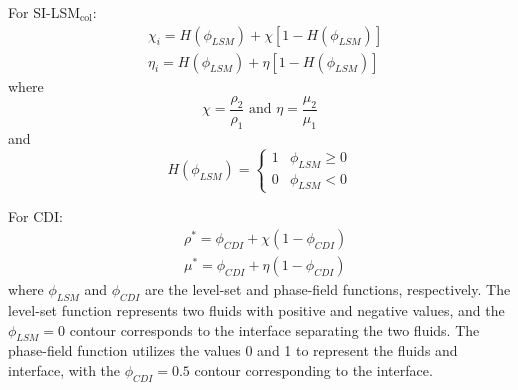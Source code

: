 \documentclass[a4paper,fleqn]{cas-sc}
\begin{document}
	\noindent For SI-LSM$_{\text{col}}$:  
	\begin{equation*}
		\begin{aligned}
			&\chi_{i}=H(\phi_{LSM}) + \chi \left[1-H(\phi_{LSM})\right]\\
			&\eta_{i}=H(\phi_{LSM}) + \eta \left[1-H(\phi_{LSM})\right]
		\end{aligned}
	\end{equation*}
	where
	\begin{equation*}
		\chi=\frac{\rho_2}{\rho_1}\text{ and }\eta=\frac{\mu_2}{\mu_1}
	\end{equation*}
	and
	\begin{equation*}
		H(\phi_{LSM})=\begin{cases}
			1&\phi_{LSM}\ge0\\
			0&\phi_{LSM}< 0
		\end{cases}
	\end{equation*}
	
	\noindent For CDI:
	\begin{equation*}
		\begin{aligned}
			&\rho^{*}=\phi_{CDI} + \chi \left(1-\phi_{CDI}\right)\\
			&\mu^{*}=\phi_{CDI} + \eta \left(1-\phi_{CDI}\right)
		\end{aligned}
	\end{equation*}
	where $\phi_{LSM}$ and $\phi_{CDI}$ are the level-set and phase-field functions, respectively. The level-set function represents two fluids with positive and negative values, and the $\phi_{LSM}=0$ contour corresponds to the interface separating the two fluids. The phase-field function utilizes the values 0 and 1 to represent the fluids and interface, with the $\phi_{CDI}=0.5$ contour corresponding to the interface.
	
\end{document}
